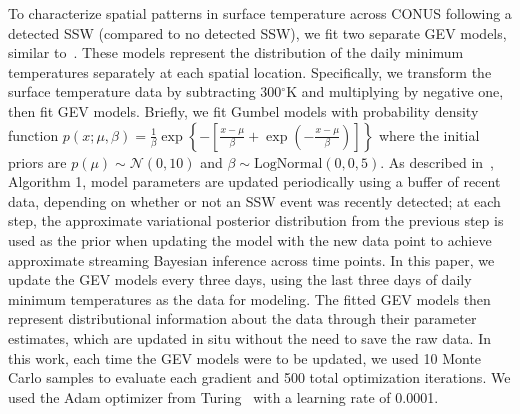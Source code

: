 \documentclass{juliacon}
\begin{document}
To characterize spatial patterns in surface temperature across CONUS following a detected SSW (compared to no detected SSW), we fit two separate GEV models, similar to~\cite{ssw_isav}. These models represent the distribution of the daily minimum temperatures separately at each spatial location. Specifically, we transform the surface temperature data by subtracting 300$^\circ$K and multiplying by negative one, then fit GEV models. Briefly, we fit Gumbel models with probability density function $p(x; \mu, \beta) = \frac{1}{\beta}\exp \left\{ -\left[ \frac{x-\mu}{\beta}+\exp\left( -\frac{x-\mu}{\beta}\right)\right] \right\}$ where the initial priors are $p(\mu) \sim \mathcal{N}(0, 10)$ and $\beta \sim \text{LogNormal}(0, 0,5)$. As described in~\cite{ssw_isav}, Algorithm 1, model parameters are updated periodically using a buffer of recent data, depending on whether or not an SSW event was recently detected; at each step, the approximate variational posterior distribution from the previous step is used as the prior when updating the model with the new data point to achieve approximate streaming Bayesian inference across time points. In this paper, we update the GEV models every three days, using the last three days of daily minimum temperatures as the data for modeling. The fitted GEV models then represent distributional information about the data through their parameter estimates, which are updated in situ without the need to save the raw data. In this work, each time the GEV models were to be updated, we used 10 Monte Carlo samples to evaluate each gradient and 500 total optimization iterations. We used the Adam optimizer from Turing~\cite{ge2018turing} with a learning rate of 0.0001. 
\end{document}
